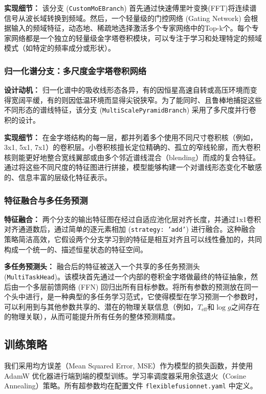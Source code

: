 \textbf{实现细节：} 该分支 (\texttt{CustomMoEBranch}) 首先通过快速傅里叶变换(FFT)将连续谱信号从波长域转换到频域。然后，一个轻量级的门控网络 (Gating Network) 会根据输入的频域特征，动态地、稀疏地选择激活多个专家网络中的Top-k个。每个专家网络都是一个独立的轻量级金字塔卷积模块，可以专注于学习和处理特定的频域模式（如特定的频率成分或形状）。

\subsubsection{归一化谱分支：多尺度金字塔卷积网络}
\textbf{设计动机：} 归一化谱中的吸收线形态各异，有的因恒星高速自转或高压环境而变得宽阔平缓，有的则因低温环境而显得尖锐狭窄。为了能同时、且鲁棒地捕捉这些不同形态的谱线特征，该分支 (\texttt{MultiScalePyramidBranch}) 采用了多尺度并行卷积的设计。

\textbf{实现细节：} 在金字塔结构的每一层，都并列着多个使用不同尺寸卷积核（例如，3x1, 5x1, 7x1）的卷积层。小卷积核擅长定位精确的、孤立的窄线轮廓，而大卷积核则能更好地整合宽线翼部或由多个邻近谱线混合（blending）而成的复合特征。通过将这些不同尺度的特征图进行拼接，模型能够构建一个对谱线形态变化不敏感的、信息丰富的层级化特征表示。

\subsubsection{特征融合与多任务预测}
\textbf{特征融合：} 两个分支的输出特征图在经过自适应池化层对齐长度，并通过1x1卷积对齐通道数后，通过简单的逐元素相加 (\texttt{strategy: 'add'}) 进行融合。这种融合策略简洁高效，它假设两个分支学习到的特征是相互对齐且可以线性叠加的，共同构成一个统一的、描述恒星状态的特征空间。

\textbf{多任务预测头：} 融合后的特征被送入一个共享的多任务预测头 (\texttt{MultiTaskHead})。该模块首先通过一个内部的卷积金字塔做最终的特征抽象，然后由一个多层前馈网络 (FFN) 回归出所有目标参数。将所有参数的预测放在同一个头中进行，是一种典型的多任务学习范式，它使得模型在学习预测一个参数时，可以利用到与其他参数共享的、潜在的物理关联信息（例如，$T_{\text{eff}}$和$\log g$之间存在的物理关联），从而可能提升所有任务的整体预测精度。

\subsection{训练策略}
\label{subsec:hfs_net_training}

我们采用均方误差（Mean Squared Error, MSE）作为模型的损失函数，并使用 AdamW 优化器进行端到端的模型训练。学习率调度器采用余弦退火（Cosine Annealing）策略。所有超参数均在配置文件 \texttt{flexiblefusionnet.yaml} 中定义。
